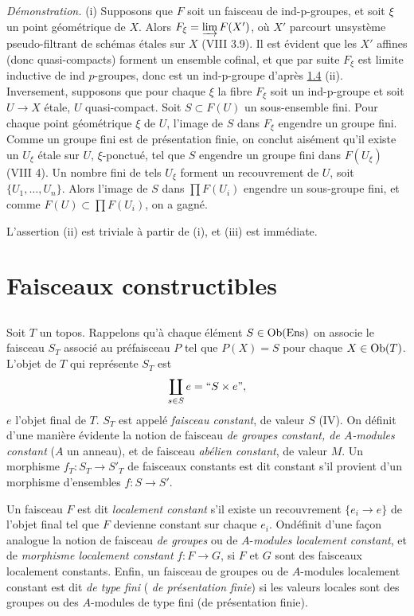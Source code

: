 \documentclass[10pt]{../fichiers-configuration-latex/smfart}
\begin{document}
\noindent
\emph{Démonstration.}
(i) Supposons que $F$ soit un faisceau de ind-p-groupes, et soit
  $\xi$ un point géométrique de $X$. Alors $F_{\xi}=\varinjlim F(X')$, où
  $X'$ parcourt un\pageoriginale système pseudo-filtrant de schémas
étales sur $X$ (VIII 3.9). Il est évident que les $X'$ affines (donc
quasi-compacts) forment un ensemble cofinal, et que par suite $F_{\xi}$ est
limite inductive de ind $p$-groupes, donc est un ind-p-groupe d'après
\hyperref[IX.prop1.4]{1.4} (ii). Inversement, supposons que pour chaque $\xi$ la fibre
$F_{\xi}$ soit un ind-p-groupe et soit $U\rightarrow X$ étale, $U$
quasi-compact. Soit $S\subset F(U)$ un sous-ensemble fini. Pour chaque
point géométrique $\xi$ de $U$, l'image de $S$ dans $F_{\xi}$ engendre
un groupe fini. Comme un groupe fini est de présentation finie, on
conclut aisément qu'il existe un $U_{\xi}$ étale sur $U$,
$\xi$-ponctué, tel que $S$ engendre un groupe fini dans $F(U_{\xi})$
(\cf VIII 4). Un nombre fini de tels $U_{\xi}$ forment un recouvrement
de $U$, soit $\{U_1,\ldots,U_n\}$. Alors l'image de $S$ dans $\prod
F(U_i)$ engendre un sous-groupe fini, et comme $F(U)\subset \prod
F(U_i)$, on a gagné.

L'assertion (ii) est triviale à partir de (i), et (iii) est immédiate.

\section{Faisceaux constructibles}

\setcounter{subsection}{-1}
\subsection{}
Soit $T$ un topos. Rappelons qu'à chaque élément $S\in \operatorname{Ob} (\operatorname{Ens})$ on
associe le faisceau $S_T$ associé au préfaisceau $P$ tel que $P(X)=S$
pour chaque $X\in \operatorname{Ob} (T)$. L'objet de $T$ qui représente $S_T$ est
$$
\coprod_{s\in S}e= ``S\times e \mbox{''}{},
$$
$e$ l'objet final de $T$. $S_T$ est appelé \emph{faisceau constant},
de valeur $S$ (IV). On définit d'une manière évidente la notion de
faisceau \emph{de groupes constant, de $A$-modules constant} ($A$ un
anneau), et de faisceau \emph{abélien constant}, de valeur $M$. Un
morphisme $f_T:S_T\rightarrow S'_T$ de faisceaux constants est dit
constant s'il provient d'un morphisme d'ensembles $f:S\rightarrow S'$.

Un faisceau $F$ est dit \emph{localement constant} s'il existe un
recouvrement $\{e_i\rightarrow e\}$ de l'objet final tel que $F$
devienne constant sur chaque $e_i$. On\pageoriginale définit d'une
façon analogue la notion de faisceau \emph{de groupes} ou de
$A$-\emph{modules localement constant}, et de \emph{morphisme
  localement constant} $f:F\rightarrow G$, si $F$ et $G$ sont des
faisceaux localement constants. Enfin, un faisceau de groupes ou de
$A$-modules localement constant est dit \emph{de type fini} (\resp
\emph{de présentation finie}) si les valeurs locales sont des groupes
ou des $A$-modules de type fini (\resp de présentation finie).
\end{document}
